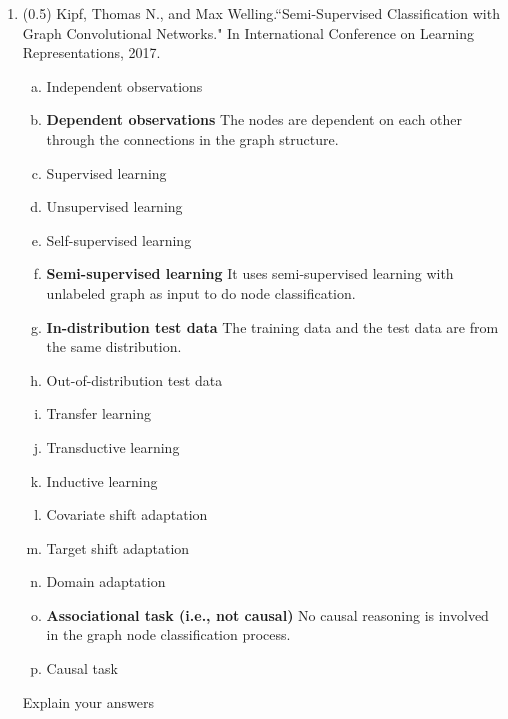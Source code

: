 \documentclass{article}
\begin{document}
\newpage
\begin{enumerate}
\item (0.5) Kipf, Thomas N., and Max Welling.``Semi-Supervised Classification with Graph Convolutional Networks." In International Conference on Learning Representations, 2017.
\begin{enumerate}[(a)]
\item Independent observations
\item \textbf{Dependent observations} The nodes are dependent on each other through the connections in the graph structure.
\item Supervised learning
\item Unsupervised learning
\item Self-supervised learning
\item \textbf{Semi-supervised learning} It uses semi-supervised learning with unlabeled graph as input to do node classification.
\item \textbf{In-distribution test data} The training data and the test data are from the same distribution.
\item Out-of-distribution test data
\item Transfer learning
\item Transductive learning
\item Inductive  learning
\item Covariate shift adaptation
\item Target shift adaptation
\item Domain adaptation
\item \textbf{Associational task (i.e., not causal)} No causal reasoning is involved in the graph node classification process.
\item Causal task
\end{enumerate}
Explain your answers\\
 
\newpage


\end{enumerate}
\end{document}
